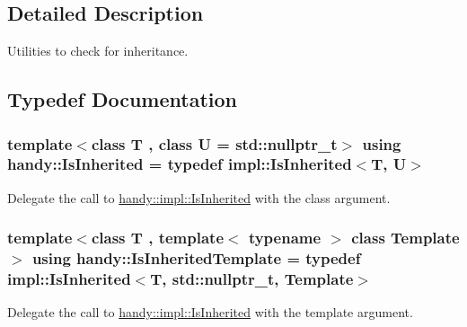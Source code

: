 \subsection{Detailed Description}
Utilities to check for inheritance. 



\subsection{Typedef Documentation}
\subsubsection[{\texorpdfstring{Is\+Inherited}{IsInherited}}]{\setlength{\rightskip}{0pt plus 5cm}template$<$class T , class U  = std\+::nullptr\+\_\+t$>$ using {\bf handy\+::\+Is\+Inherited} = typedef impl\+::\+Is\+Inherited$<$T, U$>$}\hypertarget{group__InheritanceGroup_ga534fbf017347da385a1fea5a1a9d6714}{}\label{group__InheritanceGroup_ga534fbf017347da385a1fea5a1a9d6714}


Delegate the call to \hyperlink{structhandy_1_1impl_1_1IsInherited}{handy\+::impl\+::\+Is\+Inherited} with the class argument. 

\subsubsection[{\texorpdfstring{Is\+Inherited\+Template}{IsInheritedTemplate}}]{\setlength{\rightskip}{0pt plus 5cm}template$<$class T , template$<$ typename $>$ class Template$>$ using {\bf handy\+::\+Is\+Inherited\+Template} = typedef impl\+::\+Is\+Inherited$<$T, {\bf std\+::nullptr\+\_\+t}, Template$>$}\hypertarget{group__InheritanceGroup_gaea8281081535355f96f3b6ae97f79691}{}\label{group__InheritanceGroup_gaea8281081535355f96f3b6ae97f79691}


Delegate the call to \hyperlink{structhandy_1_1impl_1_1IsInherited}{handy\+::impl\+::\+Is\+Inherited} with the template argument. 

